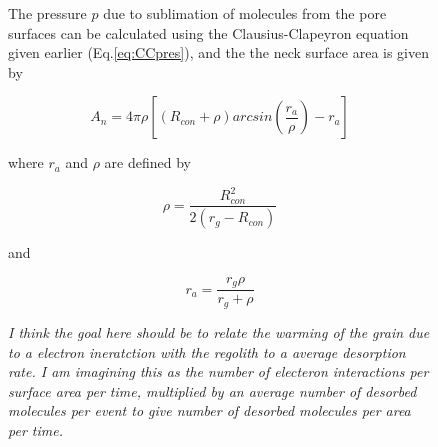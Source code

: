 \documentclass[11pt]{article} %
\begin{document}
\begin{figure}[ht]
\begin{Table}
	The pressure $p$ due to sublimation of molecules from the pore surfaces can be calculated using the Clausius-Clapeyron equation given earlier (Eq.\ref{eq:CCpres}), and the the neck surface area is given by
	
	\begin{equation}
	A_{n} = 4\pi\rho \left[ (R_{con} + \rho)arcsin\left(\frac{r_{a}}{\rho}\right) - r_{a} \right]
	\end{equation}
	
	where $r_{a}$ and $\rho$ are defined by
	
	\begin{equation}
	\rho = \frac{R_{con}^{2}}{2(r_{g}-R_{con})}
	\end{equation}
	
	and
	
	\begin{equation}
	 r_{a} = \frac{r_{g}\rho}{r_{g}+\rho}
	\end{equation}
	
	\emph{I think the goal here should be to relate the warming of the grain due to a electron ineratction with the regolith to a average desorption rate. I am imagining this as the number of electeron interactions per surface area per time, multiplied by an average number of desorbed molecules per event to give number of desorbed molecules per area per time.}
	


\end{Table}
\end{figure}
\end{document}
